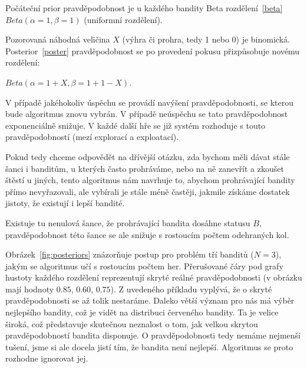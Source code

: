 \documentclass[thesis=M,czech]{FITthesis}[2014/05/07]
\begin{document}
Počáteční prior pravděpodobnost je u každého bandity Beta rozdělení~\ref{beta} ${Beta}(\alpha = 1, \beta = 1)$ (uniformní rozdělení).

Pozorovaná náhodná veličina $X$ (výhra či prohra, tedy 1 nebo 0) je binomická. Posterior~\ref{poster} pravděpodobnost se po provedení pokusu přizpůsobuje novému rozdělení:

\begin{center}
${Beta}(\alpha = 1 + X, \beta = 1 + 1 - X)$.
\end{center}

V případě jakéhokoliv úspěchu se provádí navýšení pravděpodobnosti, se kterou bude algoritmus znovu vybrán. V případě neúspěchu se tato pravděpodobnost exponenciálně snižuje. V každé další hře se již systém rozhoduje s touto pravděpodobností (mezí explorací a exploatací).

Pokud tedy chceme odpovědět na dřívější otázku, zda bychom měli dávat stále šanci i banditům, u kterých často prohráváme, nebo na ně zanevřít a zkoušet štěstí u jiných, tento algoritmus nám navrhuje to, abychom prohrávající bandity přímo nevyřazovali, ale vybírali je stále méně častěji, jakmile získáme dostatek jistoty, že existují i lepší bandité. 

Existuje tu nenulová šance, že prohrávající bandita dosáhne statusu $B$, pravděpodobnost této šance se ale snižuje s rostoucím počtem odehraných kol. 

Obrázek~\ref{fig:posteriors} znázorňuje postup pro problém tří banditů ($N = 3$), jakým se algoritmus učí s rostoucím počtem her. Přerušované čáry pod grafy hustoty každého rozdělení reprezentují skryté reálné pravděpodobnosti (v obrázku mají hodnoty $0.85$, $0.60$, $0.75$). Z uvedeného příkladu vyplývá, že o skryté pravděpodobnosti se až tolik nestaráme. Daleko větší význam pro nás má výběr nejlepšího bandity, což je vidět na distribuci červeného bandity. Ta je velice široká, což představuje skutečnou neznalost o tom, jak velkou skrytou pravděpodobností bandita disponuje. O pravděpodobnosti tedy nemáme nejmenší tušení, jsme si ale docela jistí tím, že bandita není nejlepší. Algoritmus se proto rozhodne ignorovat jej.
\end{document}
